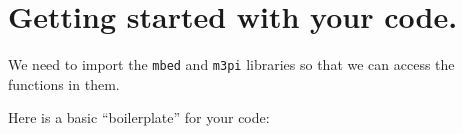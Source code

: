 \section{Getting started with your
code.}\label{getting-started-with-your-code.}

We need to import the \lstinline!mbed! and \lstinline!m3pi! libraries so
that we can access the functions in them.

Here is a basic ``boilerplate'' for your code:


